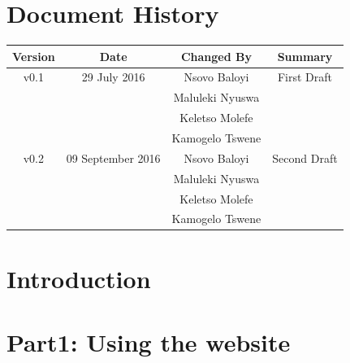 \documentclass[a4paper,12pt]{article}
\begin{document}
	\newpage
	
	\tableofcontents
	\newpage
	\section*{Document History}
	
	\begin{table}[h!]
		
		\centering %
		\begin{tabular}{c c c c} %
			\hline\hline %
			Version & Date & Changed By & Summary \\ [0.5ex] %
			\hline %
			v0.1 & 29 July 2016 & Nsovo Baloyi & First Draft 
			\\ & & Maluleki Nyuswa &  
			\\ & & Keletso Molefe &
			\\ & & Kamogelo Tswene & \\ [1ex] 
			\hline
			v0.2 & 09 September 2016 & Nsovo Baloyi & Second Draft 
			\\ & & Maluleki Nyuswa &  
			\\ & & Keletso Molefe &
			\\ & & Kamogelo Tswene & \\ [1ex] 
			\hline \hline
		\end{tabular}
		\label{table:nonlin} %
	\end{table}

	\newpage
	
	\section{Introduction}	
	

	
	\section{Part1: Using the website }
	
		
\end{document}
